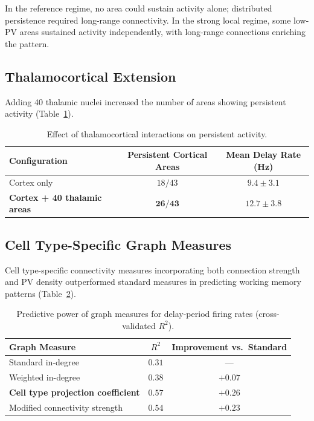 \documentclass[11pt]{article}
\begin{document}
In the reference regime, no area could sustain activity alone; distributed persistence required long-range connectivity. In the strong local regime, some low-PV areas sustained activity independently, with long-range connections enriching the pattern.

\subsection{Thalamocortical Extension}

Adding 40 thalamic nuclei increased the number of areas showing persistent activity (Table~\ref{tab:thalamus}).

\begin{table}[H]
\centering
\caption{Effect of thalamocortical interactions on persistent activity.}
\label{tab:thalamus}
\begin{tabular}{@{}lcc@{}}
\toprule
Configuration & Persistent Cortical Areas & Mean Delay Rate (Hz) \\
\midrule
Cortex only & $18/43$ & $9.4 \pm 3.1$ \\
\textbf{Cortex + 40 thalamic areas} & $\mathbf{26/43}$ & $\mathbf{12.7 \pm 3.8}$ \\
\bottomrule
\end{tabular}
\end{table}

\subsection{Cell Type-Specific Graph Measures}

Cell type-specific connectivity measures incorporating both connection strength and PV density outperformed standard measures in predicting working memory patterns (Table~\ref{tab:graph}).

\begin{table}[H]
\centering
\caption{Predictive power of graph measures for delay-period firing rates (cross-validated $R^2$).}
\label{tab:graph}
\begin{tabular}{@{}lcc@{}}
\toprule
Graph Measure & $R^2$ & Improvement vs.\ Standard \\
\midrule
Standard in-degree & $0.31$ & --- \\
Weighted in-degree & $0.38$ & $+0.07$ \\
\textbf{Cell type projection coefficient} & $\mathbf{0.57}$ & $\mathbf{+0.26}$ \\
Modified connectivity strength & $0.54$ & $+0.23$ \\
\bottomrule
\end{tabular}
\end{table}
\end{document}
